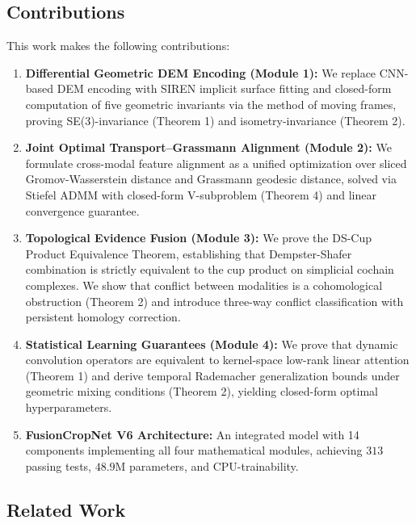 \subsection{Contributions}

This work makes the following contributions:

\begin{enumerate}
    \item \textbf{Differential Geometric DEM Encoding (Module 1):} We replace
    CNN-based DEM encoding with SIREN implicit surface fitting and closed-form
    computation of five geometric invariants via the method of moving frames,
    proving SE(3)-invariance (Theorem 1) and isometry-invariance (Theorem 2).

    \item \textbf{Joint Optimal Transport--Grassmann Alignment (Module 2):} We
    formulate cross-modal feature alignment as a unified optimization over
    sliced Gromov-Wasserstein distance and Grassmann geodesic distance, solved
    via Stiefel ADMM with closed-form V-subproblem (Theorem 4) and linear
    convergence guarantee.

    \item \textbf{Topological Evidence Fusion (Module 3):} We prove the DS-Cup
    Product Equivalence Theorem, establishing that Dempster-Shafer combination
    is strictly equivalent to the cup product on simplicial cochain complexes.
    We show that conflict between modalities is a cohomological obstruction
    (Theorem 2) and introduce three-way conflict classification with persistent
    homology correction.

    \item \textbf{Statistical Learning Guarantees (Module 4):} We prove that
    dynamic convolution operators are equivalent to kernel-space low-rank linear
    attention (Theorem 1) and derive temporal Rademacher generalization bounds
    under geometric mixing conditions (Theorem 2), yielding closed-form optimal
    hyperparameters.

    \item \textbf{FusionCropNet V6 Architecture:} An integrated model with 14
    components implementing all four mathematical modules, achieving $313$
    passing tests, $48.9$M parameters, and CPU-trainability.
\end{enumerate}

\subsection{Related Work}

